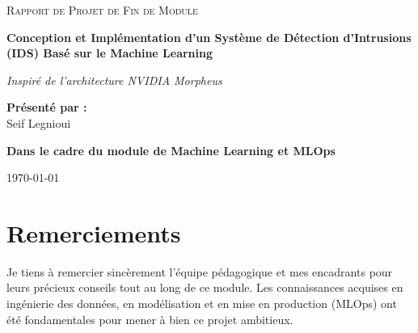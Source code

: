 \documentclass[12pt,a4paper]{report}
\begin{document}
\begin{titlepage}
    \centering
    \vspace*{1cm}
    
    {\scshape\LARGE Rapport de Projet de Fin de Module \par}
    \vspace{1.5cm}
    
    {\huge\bfseries Conception et Implémentation d'un Système de Détection d'Intrusions (IDS) Basé sur le Machine Learning\par}
    \vspace{0.5cm}
    {\Large \textit{Inspiré de l'architecture NVIDIA Morpheus}}
    
    \vspace{2cm}
    
    \textbf{Présenté par :}\\
    {\Large Seif Legnioui}
    
    \vspace{2cm}
    \textbf{Dans le cadre du module de Machine Learning et MLOps}
    
    \vfill
    
    {\large \today\par}
\end{titlepage}

\chapter*{Remerciements}
Je tiens à remercier sincèrement l'équipe pédagogique et mes encadrants pour leurs précieux conseils tout au long de ce module. Les connaissances acquises en ingénierie des données, en modélisation et en mise en production (MLOps) ont été fondamentales pour mener à bien ce projet ambitieux.
\end{document}
